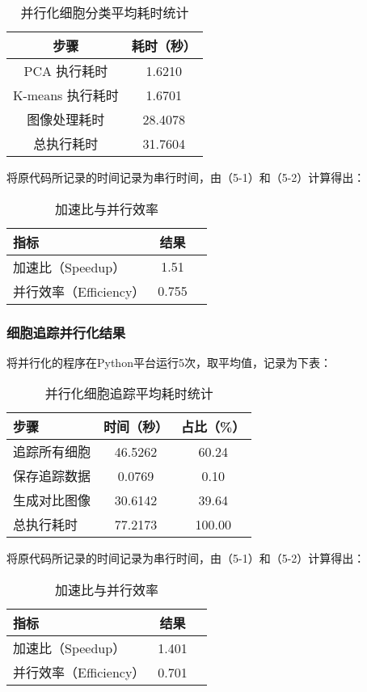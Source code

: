 \begin{table}[!htbp]
    \centering
    \caption{并行化细胞分类平均耗时统计}
    \begin{tabular*}{300pt}{@{\extracolsep{\fill}}cc}
        \toprule
        步骤             & 耗时（秒） \\
        \midrule
        PCA 执行耗时     & 1.6210     \\
        K-means 执行耗时 & 1.6701     \\
        图像处理耗时     & 28.4078    \\
        总执行耗时       & 31.7604    \\
        \bottomrule
    \end{tabular*}
\end{table}


将原代码所记录的时间记录为串行时间，由（5-1）和（5-2）计算得出：
\begin{table}[htbp]
    \centering
    \caption{加速比与并行效率}
    \begin{tabular}{lcc}
    \toprule
    指标  & 结果 \\
    \midrule
    加速比（Speedup） & 1.51 \\
    并行效率（Efficiency）  & 0.755 \\
    \bottomrule
    \end{tabular}
\end{table}
\subsubsection{细胞追踪并行化结果}
将并行化的程序在Python平台运行5次，取平均值，记录为下表：
\begin{table}[htbp]
    \centering
    \caption{并行化细胞追踪平均耗时统计}
    \begin{tabular*}{350pt}{@{\extracolsep{\fill}}lcc}
        \toprule
        步骤 & 时间（秒） & 占比（\%） \\
        \midrule
        追踪所有细胞     & 46.5262 & 60.24 \\
        保存追踪数据     & 0.0769  & 0.10 \\
        生成对比图像     & 30.6142 & 39.64 \\
        总执行耗时       & 77.2173 & 100.00 \\
        \bottomrule
    \end{tabular*}
\end{table}

将原代码所记录的时间记录为串行时间，由（5-1）和（5-2）计算得出：
\begin{table}[htbp]
    \centering
    \caption{加速比与并行效率}
    \begin{tabular}{lcc}
    \toprule
    指标  & 结果 \\
    \midrule
    加速比（Speedup） & 1.401 \\
    并行效率（Efficiency）  & 0.701 \\
    \bottomrule
    \end{tabular}
\end{table}
\newpage
